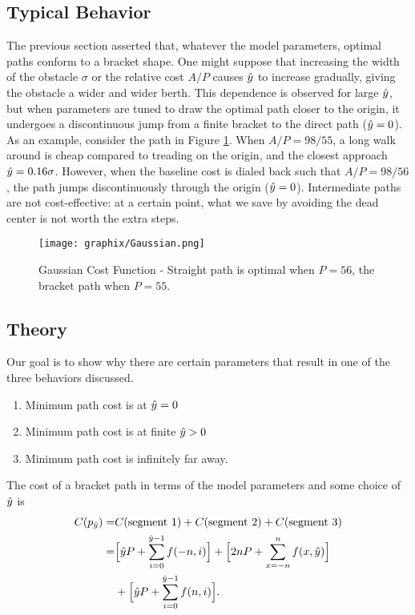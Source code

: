 \subsection{Typical Behavior}

The previous section asserted that, whatever the model parameters, optimal paths conform to a bracket shape. One might suppose that increasing the width of the obstacle $\sigma$ or the relative cost $A/P$ causes $\hat{y}$ to increase gradually, giving the obstacle a wider and wider berth. This dependence is observed for large $\hat{y}$, but when parameters are tuned to draw the optimal path closer to the origin, it undergoes a discontinuous jump from a finite bracket to the direct path ($\hat{y}=0$). As an example, consider the path in Figure \ref{fig:gaussian}. When $A/P=98/55$, a long walk around is cheap compared to treading on the origin, and the closest approach $\hat{y}=0.16\sigma$. However, when the baseline cost is dialed back such that $A/P=98/56$, the path jumps discontinuously through the origin ($\hat{y}=0$). Intermediate paths are not cost-effective: at a certain point, what we save by avoiding the dead center is not worth the extra steps.

\begin{figure}
\texttt{[image: graphix/Gaussian.png]}
\caption{Gaussian Cost Function - Straight path is optimal when $P=56$, the bracket path when $P=55$. }
\label{fig:gaussian}
\end{figure}

\subsection{Theory}
Our goal is to show why there are certain parameters that result in one of the three behaviors discussed. 
\begin{enumerate}
\item Minimum path cost is at $\hat{y}=0$
\item Minimum path cost is at finite $\hat{y}>0$
\item Minimum path cost is infinitely far away. 
\end{enumerate}

The cost of a bracket path in terms of the model parameters and some choice of $\hat{y}$ is 
\begin{align*}
C(p_{\hat{y}}) =& C(\text{segment 1}) + C(\text{segment 2}) + C(\text{segment 3}) \\
=&\Big[\hat{y} P + \sum\limits_{i=0}^{\hat{y}-1} f(-n, i) \Big] +
         \Big[2nP + \sum\limits_{x=-n}^{n}    f(x,\hat{y}) \Big]\\
     &+\Big[\hat{y} P + \sum\limits_{i=0}^{\hat{y}-1} f(n, i) \Big].
\end{align*}

